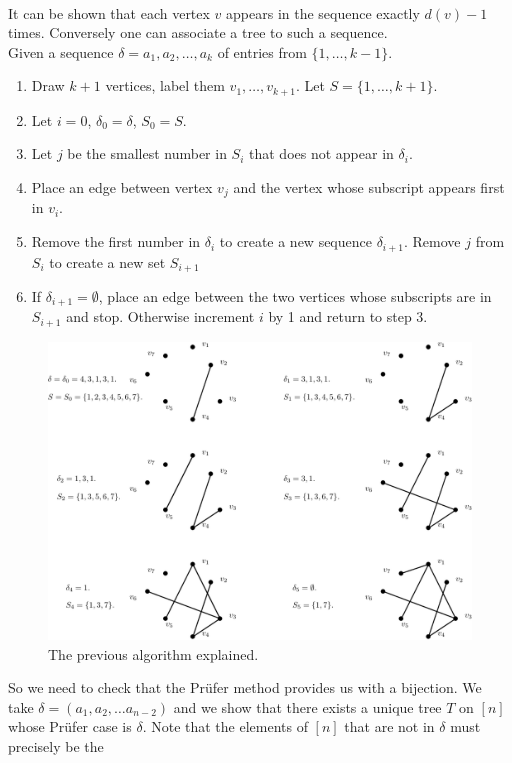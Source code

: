 \documentclass[12pt,a4paper]{article}
\theoremstyle{definition}
\begin{document}
\\
It can be shown that each vertex $v$ appears in the sequence exactly $d(v)-1$ times. Conversely one can associate a tree to such a sequence.  \\
Given a sequence $\delta=a_1,a_2, \dots ,  a_k$ of entries from $\{1, \dots , k-1\}$.
\begin{enumerate}
\item Draw $k+1$ vertices, label them $v_1, \dots ,  v_{k+1}$. Let $S=\{1, \dots , k+1\}. $
\item Let $i=0$, $\delta_0=\delta$, $S_0=S$.
\item Let $j$ be the smallest number in $S_i$ that does not appear in $\delta_i$.
\item Place an edge between vertex $v_j$ and the vertex whose subscript appears first in $v_i$.
\item Remove the first number in $\delta_i$ to create a new sequence $\delta_{i+1}$. Remove $j$ from $S_i$ to create a new set $S_{i+1}$
\item If $\delta_{i+1}= \emptyset$, place an edge between the two vertices whose subscripts are in $S_{i+1}$ and stop. Otherwise increment $i$ by 1 and return to step 3.
\end{enumerate}
\newpage
\begin{figure}[hbtp]
\centering
\includegraphics[scale=.71]{images/graph32.pdf}
\caption{The previous algorithm explained.}
\end{figure}
So we need to check that the Prüfer method provides us with a bijection. We take $\delta=(a_1,a_2,\dots a_{n-2})$ and we show that there exists a unique tree $T$ on $[n]$ whose Prüfer case is $\delta$. Note that the elements of $[n]$ that are not in $\delta$ must precisely be the \\\\
\end{document}
